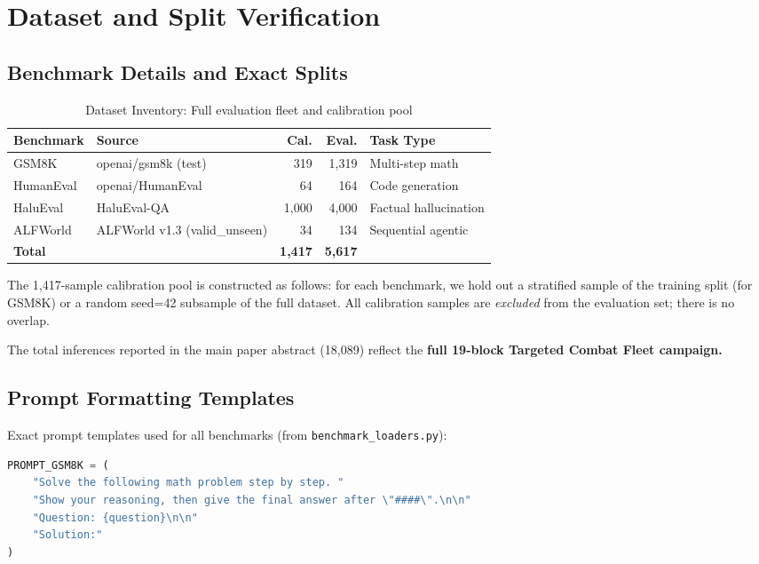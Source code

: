 \documentclass[twoside]{article}
\begin{document}
\section{Dataset and Split Verification}
\label{app:data}

\subsection{Benchmark Details and Exact Splits}

\begin{table}[H]
\centering
\caption{Dataset Inventory: Full evaluation fleet and calibration pool}
\label{tab:datasets}
\begin{tabular}{@{}llrrl@{}}
\toprule
\textbf{Benchmark} & \textbf{Source} & \textbf{Cal.} & \textbf{Eval.} & \textbf{Task Type} \\
\midrule
GSM8K & openai/gsm8k (test) & 319 & 1{,}319 & Multi-step math \\
HumanEval & openai/HumanEval & 64 & 164 & Code generation \\
HaluEval & HaluEval-QA & 1{,}000 & 4{,}000 & Factual hallucination \\
ALFWorld & ALFWorld v1.3 (valid\_unseen) & 34 & 134 & Sequential agentic \\
\midrule
\textbf{Total} & & \textbf{1{,}417} & \textbf{5{,}617} & \\
\bottomrule
\end{tabular}
\end{table}

\noindent The 1,417-sample calibration pool is constructed as follows: for each benchmark, we hold out a stratified sample of the training split (for GSM8K) or a random seed=42 subsample of the full dataset. All calibration samples are \emph{excluded} from the evaluation set; there is no overlap.

The total inferences reported in the main paper abstract (18,089) reflect the \textbf{full 19-block Targeted Combat Fleet campaign.}

\subsection{Prompt Formatting Templates}
\label{app:prompts}

Exact prompt templates used for all benchmarks (from \texttt{benchmark\_loaders.py}):

\begin{lstlisting}[language=Python, caption={GSM8K Prompt Template}]
PROMPT_GSM8K = (
    "Solve the following math problem step by step. "
    "Show your reasoning, then give the final answer after \"####\".\n\n"
    "Question: {question}\n\n"
    "Solution:"
)
\end{lstlisting}
\end{document}

